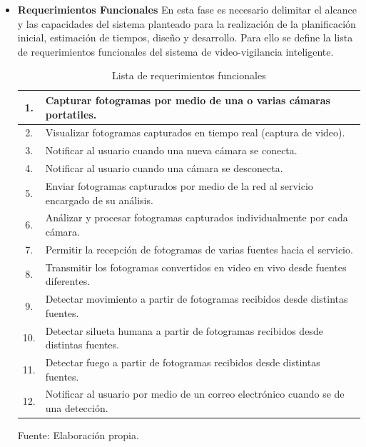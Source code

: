 \begin{itemize}
    \item \textbf{Requerimientos Funcionales}
    En esta fase es necesario delimitar el alcance y las capacidades del sistema planteado para la realización de la planificación inicial, estimación de tiempos, diseño y desarrollo. Para ello se define la lista de requerimientos funcionales del sistema de video-vigilancia inteligente.
    
    \begin{table}[H]
        \caption{Lista de requerimientos funcionales }
        \label{tabla:req_funcionales}
        \begin{center}
            \begin{tabular}{ |c|l|} 
                \hline
                1. & Capturar fotogramas por medio de una o varias cámaras portatiles.\\ \hline
                2. & Visualizar fotogramas capturados en tiempo real (captura de video).\\  \hline
                3. & Notificar al usuario cuando una nueva cámara se conecta.\\  \hline
                4. & Notificar al usuario cuando una cámara se desconecta.\\  \hline
                5. & Enviar fotogramas capturados por medio de la red al servicio encargado de su análisis.\\ \hline
                6. & Análizar y procesar fotogramas capturados individualmente por cada cámara.\\  \hline
                7. & Permitir la recepción de fotogramas de varias fuentes hacia el servicio.\\ \hline
                8. & Transmitir los fotogramas convertidos en video en vivo desde fuentes diferentes.\\ \hline
                9. & Detectar movimiento a partir de fotogramas recibidos desde distintas fuentes.\\ \hline
                10. & Detectar silueta humana a partir de fotogramas recibidos desde distintas fuentes.\\ \hline
                11. & Detectar fuego a partir de fotogramas recibidos desde distintas fuentes.\\ \hline
                12. & Notificar al usuario por medio de un correo electrónico cuando se de una detección.\\ \hline
            \end{tabular}
        \end{center}
        \begin{center}
            Fuente: Elaboración propia.
        \end{center}
    \end{table}


\end{itemize}

